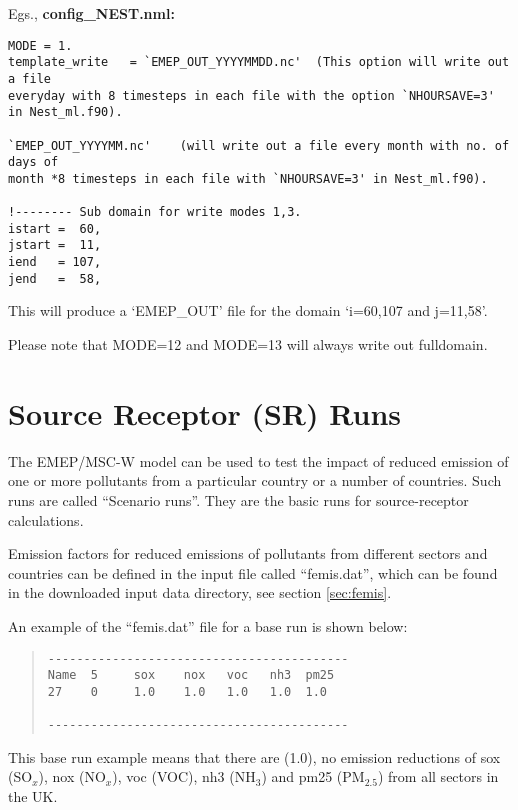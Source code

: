 Egs.,  {\bf config\_NEST.nml:}

\begin{verbatim}
MODE = 1.
template_write   = `EMEP_OUT_YYYYMMDD.nc'  (This option will write out a file 
everyday with 8 timesteps in each file with the option `NHOURSAVE=3' in Nest_ml.f90).  

`EMEP_OUT_YYYYMM.nc'    (will write out a file every month with no. of days of 
month *8 timesteps in each file with `NHOURSAVE=3' in Nest_ml.f90).
				
!-------- Sub domain for write modes 1,3. 
istart =  60,   
jstart =  11,   
iend   = 107,   
jend   =  58,   
\end{verbatim}

This will produce a `EMEP\_OUT' file for the domain `i=60,107 and j=11,58'.  

Please note that MODE=12 and MODE=13 will always write out fulldomain.   




\section {Source Receptor (SR) Runs}

The EMEP/MSC-W model can be used to test the impact of reduced emission of
one or more pollutants from a particular country or a number of
countries.  Such runs are called ``Scenario runs''. They are the basic
runs for source-receptor calculations.

Emission factors for reduced emissions of pollutants from different
sectors and countries can be defined in the input file called
``femis.dat'', which can be found in the downloaded input data
directory, see section \ref{sec:femis}.

An example of the ``femis.dat'' file for a base run is shown below:
\begin{quote}

\begin{verbatim}
------------------------------------------
Name  5     sox    nox   voc   nh3  pm25
27    0     1.0    1.0   1.0   1.0  1.0  

------------------------------------------
\end{verbatim}
\end{quote}
\noindent
This base run example means that there are (1.0), no emission reductions of 
sox (SO$_x$), nox (NO$_x$), voc (VOC), nh3 (NH$_3$) and pm25 (PM$_{2.5}$) from 
all sectors in the UK. 

